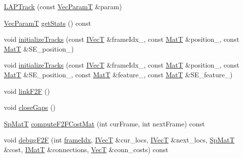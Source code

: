 \begin{DoxyCompactItemize}
\item 
\hyperlink{classtracker_1_1LAPTrack_a276996ee58188944dd1d81f767ce0474}{L\+A\+P\+Track} (const \hyperlink{classtracker_1_1Tracker_a1a79f7073d8e1a032369dcc8105604ce}{Vec\+ParamT} \&param)
\item 
\hyperlink{classtracker_1_1Tracker_a1a79f7073d8e1a032369dcc8105604ce}{Vec\+ParamT} \hyperlink{classtracker_1_1LAPTrack_ab5dc7bdfbaafa9eafec4d9fd7ade3411}{get\+Stats} () const 
\item 
void \hyperlink{classtracker_1_1LAPTrack_a9561d939e76b3ed9afca03cc4d457c9e}{initialize\+Tracks} (const \hyperlink{classtracker_1_1Tracker_a59a6e01be987f9c0093a8ac5ad97ce33}{I\+VecT} \&frame\+Idx\+\_\+, const \hyperlink{classtracker_1_1Tracker_a60a1d6ee07284ba82f0533c79311ccfd}{MatT} \&position\+\_\+, const \hyperlink{classtracker_1_1Tracker_a60a1d6ee07284ba82f0533c79311ccfd}{MatT} \&S\+E\+\_\+position\+\_\+)
\item 
void \hyperlink{classtracker_1_1LAPTrack_a22ba01a68c707be9b3e906e14b84ff1f}{initialize\+Tracks} (const \hyperlink{classtracker_1_1Tracker_a59a6e01be987f9c0093a8ac5ad97ce33}{I\+VecT} \&frame\+Idx\+\_\+, const \hyperlink{classtracker_1_1Tracker_a60a1d6ee07284ba82f0533c79311ccfd}{MatT} \&position\+\_\+, const \hyperlink{classtracker_1_1Tracker_a60a1d6ee07284ba82f0533c79311ccfd}{MatT} \&S\+E\+\_\+position\+\_\+, const \hyperlink{classtracker_1_1Tracker_a60a1d6ee07284ba82f0533c79311ccfd}{MatT} \&feature\+\_\+, const \hyperlink{classtracker_1_1Tracker_a60a1d6ee07284ba82f0533c79311ccfd}{MatT} \&S\+E\+\_\+feature\+\_\+)
\item 
void \hyperlink{classtracker_1_1LAPTrack_acb3db52d2371baf8f96c35cf9e3741bd}{link\+F2F} ()
\item 
void \hyperlink{classtracker_1_1LAPTrack_a7e1ce573ac1f20bbb1f7bb6a51876525}{close\+Gaps} ()
\item 
\hyperlink{classtracker_1_1LAPTrack_a85e4da204f0881dd4b46caf38bcef737}{Sp\+MatT} \hyperlink{classtracker_1_1LAPTrack_a993c8f819a93d6d2ed442a1678c5ce81}{compute\+F2\+F\+Cost\+Mat} (int cur\+Frame, int next\+Frame) const 
\item 
void \hyperlink{classtracker_1_1LAPTrack_a1f334e86d674d5fa4eb69b281e3db62c}{debug\+F2F} (int \hyperlink{classtracker_1_1Tracker_aa3e32ff8183fe70af1d351f6324e7615}{frame\+Idx}, \hyperlink{classtracker_1_1Tracker_a59a6e01be987f9c0093a8ac5ad97ce33}{I\+VecT} \&cur\+\_\+locs, \hyperlink{classtracker_1_1Tracker_a59a6e01be987f9c0093a8ac5ad97ce33}{I\+VecT} \&next\+\_\+locs, \hyperlink{classtracker_1_1LAPTrack_a85e4da204f0881dd4b46caf38bcef737}{Sp\+MatT} \&cost, \hyperlink{classtracker_1_1Tracker_a6de023cd3b5466996624c7e1b7e5d551}{I\+MatT} \&connections, \hyperlink{classtracker_1_1Tracker_a9905fa9b81b252716e651d87d7d57aff}{VecT} \&conn\+\_\+costs) const 

\end{DoxyCompactItemize}
